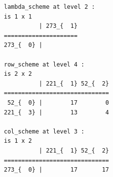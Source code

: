 \begin{verbatim}
lambda_scheme at level 2 : 
is 1 x 1
          | 273_{  1}
=====================
273_{  0} | 

row_scheme at level 4 : 
is 2 x 2
          | 221_{  1} 52_{  2}
==============================
 52_{  0} |        17        0
221_{  3} |        13        4

col_scheme at level 3 : 
is 1 x 2
          | 221_{  1} 52_{  2}
==============================
273_{  0} |        17       17
\end{verbatim}
